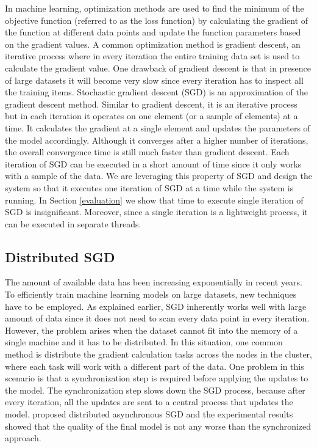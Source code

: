 \documentclass{vldb}
\begin{document}
In machine learning, optimization methods are used to find the minimum of the objective function (referred to as the loss function) by calculating the gradient of the function at different data points and update the function parameters based on the gradient values.
A common optimization method is gradient descent, an iterative process where in every iteration the entire training data set is used to calculate the gradient value.
One drawback of gradient descent is that in presence of large datasets it will become very slow since every iteration has to inspect all the training items.
Stochastic gradient descent (SGD) is an approximation of the gradient descent method. 
Similar to gradient descent, it is an iterative process but in each iteration it operates on one element (or a sample of elements) at a time. 
It calculates the gradient at a single element and updates the parameters of the model accordingly. 
Although it converges after a higher number of iterations, the overall convergence time is still much faster than gradient descent. 
Each iteration of SGD can be executed in a short amount of time since it only works with a sample of the data.
We are leveraging this property of SGD and design the system so that it executes one iteration of SGD at a time while the system is running.
In Section \ref{evaluation} we show that time to execute single iteration of SGD is insignificant.
Moreover, since a single iteration is a lightweight process, it can be executed in separate threads.

\subsection{Distributed SGD}
The amount of available data has been increasing exponentially in recent years.
To efficiently train machine learning models on large datasets, new techniques have to be employed.
As explained earlier, SGD inherently works well with large amount of data since it does not need to scan every data point in every iteration.
However, the problem arises when the dataset cannot fit into the memory of a single machine and it has to be distributed.
In this situation, one common method is distribute the gradient calculation tasks across the nodes in the cluster, where each task will work with a different part of the data.
One problem in this scenario is that a synchronization step is required before applying the updates to the model. 
The synchronization step slows down the SGD process, because after every iteration, all the updates are sent to a central process that updates the model.
\cite{recht2011hogwild, dean2012large} proposed distributed asynchronous SGD and the experimental results showed that the quality of the final model is not any worse than the synchronized approach. 
\end{document}
